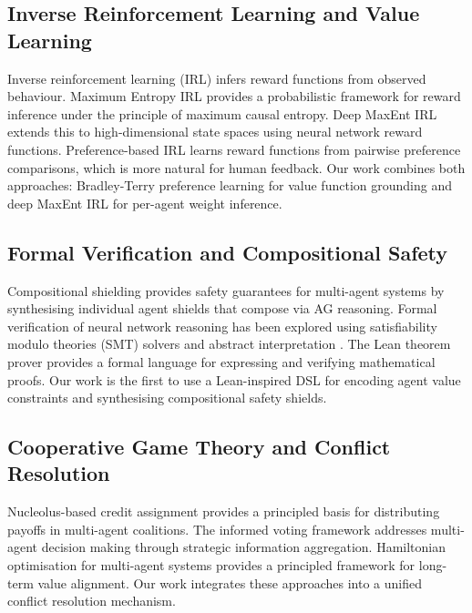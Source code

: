 \documentclass[12pt,a4paper]{article}
\begin{document}
\subsection{Inverse Reinforcement Learning and Value Learning}

Inverse reinforcement learning (IRL) \citep{ng2000algorithms} infers reward functions
from observed behaviour. Maximum Entropy IRL \citep{ziebart2008maximum} provides a
probabilistic framework for reward inference under the principle of maximum causal
entropy. Deep MaxEnt IRL \citep{wulfmeier2015maximum} extends this to high-dimensional
state spaces using neural network reward functions. Preference-based IRL
\citep{christiano2017deep} learns reward functions from pairwise preference
comparisons, which is more natural for human feedback. Our work combines both
approaches: Bradley-Terry preference learning for value function grounding and deep
MaxEnt IRL for per-agent weight inference.

\subsection{Formal Verification and Compositional Safety}

Compositional shielding \citep{brorholt2025compositional} provides safety guarantees
for multi-agent systems by synthesising individual agent shields that compose via AG
reasoning. Formal verification of neural network reasoning has been explored using
satisfiability modulo theories (SMT) solvers \citep{katz2017reluplex} and abstract
interpretation \citep{gehr2018ai2}. The Lean theorem prover \citep{moura2021lean4}
provides a formal language for expressing and verifying mathematical proofs. Our work
is the first to use a Lean-inspired DSL for encoding agent value constraints and
synthesising compositional safety shields.

\subsection{Cooperative Game Theory and Conflict Resolution}

Nucleolus-based credit assignment \citep{li2025nucleolus} provides a principled
basis for distributing payoffs in multi-agent coalitions. The informed voting framework
\citep{informed2025voting} addresses multi-agent decision making through strategic
information aggregation. Hamiltonian optimisation for multi-agent systems
\citep{frimpong2026grmadrl} provides a principled framework for long-term value
alignment. Our work integrates these approaches into a unified conflict resolution
mechanism.
\end{document}
